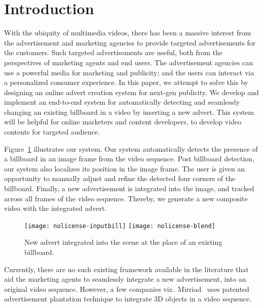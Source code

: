 \documentclass[runningheads]{llncs}
\begin{document}
\section{Introduction}
\vspace{-0.1in}
With the ubiquity of multimedia videos, there has been a massive interest from the advertisement and marketing agencies to provide targeted advertisements for the customers. Such targeted advertisements are useful, both from the perspectives of marketing agents and end users. The advertisement agencies can use a powerful media for marketing and publicity; and the users can interact via a personalized consumer experience. In this paper, we attempt to solve this by designing an online advert creation system for next-gen publicity. We develop and implement an end-to-end system for automatically detecting and seamlessly changing an existing billboard in a video by inserting a new advert. This system will be helpful for online marketers and content developers, to develop video contents for targeted audience. 

Figure~\ref{fig:advert-story} illustrates our system. Our system automatically detects the presence of a billboard in an image frame from the video sequence. Post billboard detection, our system also localizes its position in the image frame. The user is given an opportunity to manually adjust and refine the detected four corners of the billboard. Finally, a new advertisement is integrated into the image, and tracked across all frames of the video sequence. Thereby, we generate a new composite video with the integrated advert.

\begin{figure}[htb]
\centering
\texttt{[image: nolicense-inputbill]}
\texttt{[image: nolicense-blend]}
\caption{New advert integrated into the scene at the place of an existing billboard.}
\label{fig:advert-story}
\vspace{-0.8cm}
\end{figure}

Currently, there are no such existing framework available in the literature that aid the marketing agents to seamlessly integrate a new advertisement, into an original video sequence. However, a few companies viz.\ Mirriad~\cite{mirriad2018} uses patented advertisement plantation technique to integrate 3D objects in a video sequence.  
\end{document}
